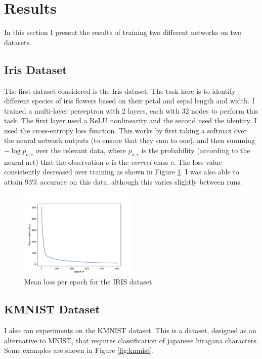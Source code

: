 \documentclass[11pt]{article}
\begin{document}
\section*{Results}

In this section I present the results of training two different networks on two datasets.

\subsection*{Iris Dataset}

The first dataset considered is the Iris dataset. The task here is to identify different species of iris flowers 
based on their petal and sepal length and width. I trained a multi-layer perceptron with 2 layers, each with 32 nodes
to perform this task. The first layer used a ReLU nonlinearity and the second used the identity. I used the 
cross-entropy loss function. This works by first taking a softmax over the neural network outputs (to ensure that they
sum to one), and then summing $-\log p_{o, c}$ over the relevant data, where $p_{o, c}$ is the probability (according
to the neural net) that the observation $o$ is the \emph{correct} class $c$. The loss value consistently decreased 
over training as shown in Figure \ref{fig:iris}. I was also able to attain 93\% accuracy on this data, although this varies
slightly between runs.

\begin{figure}
    \centering
    \includegraphics[width=0.5\textwidth]{Dataset.IRIS_training_loss}
    \caption{Mean loss per epoch for the IRIS dataset}
    \label{fig:iris}
\end{figure}

\subsection*{KMNIST Dataset}
I also ran experiments on the KMNIST dataset. This is a dataset, designed as an alternative to MNIST, that requires
classification of japanese hiragana characters. Some examples are shown in Figure \ref{fig:kmnist}.
\end{document}
